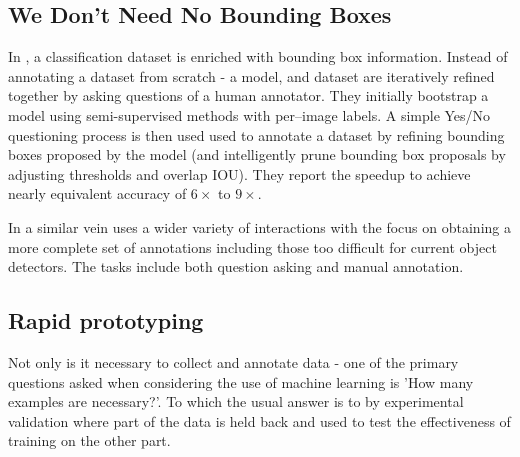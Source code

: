 \subsection {We Don't Need No Bounding Boxes}
In \cite{Papadopoulos2016}, a classification dataset is enriched with bounding box information. Instead of annotating a dataset from scratch - a model, and dataset are iteratively refined together by asking questions of a human annotator. They initially bootstrap a model using semi-supervised methods with per--image labels. A simple Yes/No questioning process is then used used to annotate a dataset by refining bounding boxes proposed by the model (and intelligently prune bounding box proposals by adjusting thresholds and overlap \gls{IOU}). They report the speedup to achieve nearly equivalent accuracy of $6\times$ to $9\times$.

In a similar vein \cite{Russakovsky2015a} uses a wider variety of interactions with the focus on obtaining a more complete set of annotations including those too difficult for current object detectors. The tasks include both question asking and manual annotation.







\subsection {Rapid prototyping}

Not only is it necessary to collect and annotate data - one of the primary questions asked when considering the use of machine learning is 'How many examples are necessary?'. To which the usual answer is to by experimental validation where part of the data is held back and used to test the effectiveness of training on the other part.







